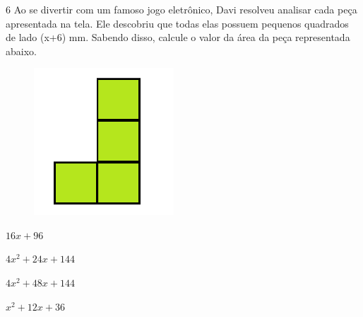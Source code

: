 














\num{6} Ao se divertir com um famoso jogo eletrônico, Davi resolveu analisar
cada peça apresentada na tela. Ele descobriu que todas elas possuem
pequenos quadrados de lado (x+6) mm. Sabendo disso, calcule o valor da
área da peça representada abaixo.

\begin{figure}[H]
\centering\includegraphics[width=2.05833in,height=2.16573in]{./imgSAEB_8_MAT/media/image57.png}
\end{figure}

\begin{escolha}
\item $16x + 96$
\item $4x^2 + 24x+ 144$
\item $4x^2 + 48x+144$
\item $x^2 + 12x + 36$
\end{escolha}

